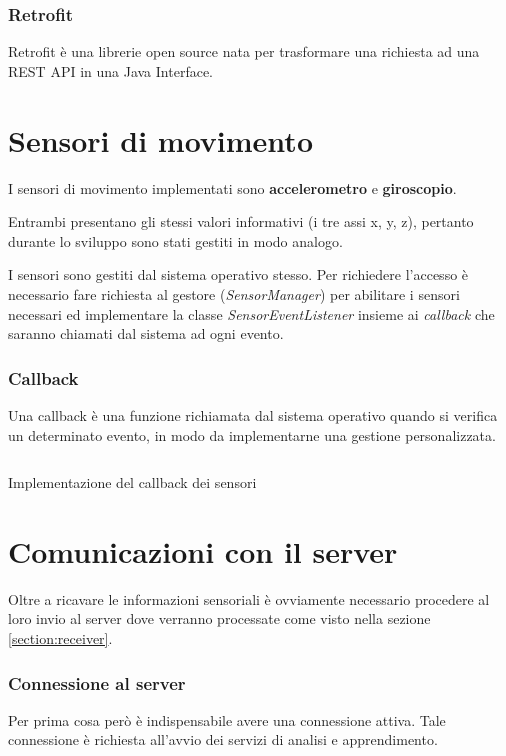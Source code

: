 \subsubsection{Retrofit}
Retrofit \cite{retrofit} è una librerie open source nata per trasformare una richiesta ad una REST API 
in una Java Interface.


\newpage
\section{Sensori di movimento}
I sensori di movimento implementati sono \textbf{accelerometro} e \textbf{giroscopio}.

Entrambi presentano gli stessi valori informativi (i tre assi x, y, z), pertanto durante lo sviluppo sono stati gestiti in modo analogo.

I sensori sono gestiti dal sistema operativo stesso. Per richiedere l'accesso è necessario fare richiesta al gestore (\textit{SensorManager}) 
per abilitare i sensori necessari ed implementare la classe \textit{SensorEventListener} \cite{sensor}
insieme ai \textit{callback} che saranno chiamati dal sistema ad ogni evento.
\subsubsection{Callback}
Una callback è una funzione richiamata dal sistema operativo quando si verifica un determinato evento, in modo da implementarne 
una gestione personalizzata.

\begin{listing}[H] 
    \inputminted[frame=single,framesep=10pt]{java}{assets/snippets/app/sensors.java}
    \caption{Implementazione del callback dei sensori}
    \label{listing:sensor-event-callback}
\end{listing}



\newpage
\section{Comunicazioni con il server}
Oltre a ricavare le informazioni sensoriali è ovviamente necessario procedere al loro invio al server  
dove verranno processate come visto nella sezione \ref{section:receiver}.
\subsubsection{Connessione al server}
Per prima cosa però è indispensabile avere una connessione attiva. Tale connessione è richiesta all'avvio dei servizi di 
analisi e apprendimento.

